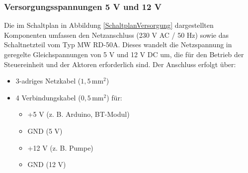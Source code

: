 \subsubsection{Versorgungsspannungen 5 V und 12 V}
Die im Schaltplan in Abbildung \ref{SchaltplanVersorgung} dargestellten Komponenten umfassen den Netzanschluss (230 V AC / 50 Hz) sowie das Schaltnetzteil vom Typ MW RD-50A. Dieses wandelt die Netzspannung in geregelte Gleichspannungen von 5 V und 12 V DC um, die für den Betrieb der Steuereinheit und der Aktoren erforderlich sind. Der Anschluss erfolgt über:
\begin{itemize}
	\item 3-adriges Netzkabel (\(1{,}5\,\text{mm}^2\))
	\item 4 Verbindungskabel (\(0{,}5\,\text{mm}^2\)) für:
	\begin{itemize}
		\item +5 V (z. B. Arduino, BT-Modul)
		\item GND (5 V)
		\item +12 V (z. B. Pumpe)
		\item GND (12 V)
	\end{itemize}
\end{itemize}
